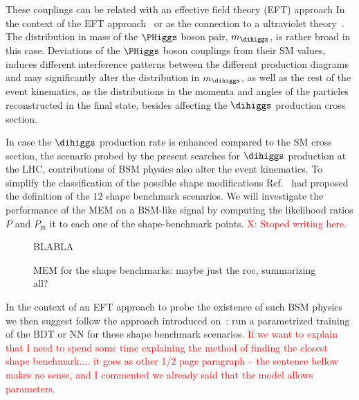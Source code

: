 These couplings can be related with an effective field theory (EFT) approach
In the context of the EFT approach~\cite{Buchalla:2015wfa, Goertz:2014qta} or as the connection to a ultraviolet theory~\cite{Carvalho:2017vnu,Belusca-Maito:2016dqe,deBlas:2014mba,Dawson:2017vgm}. %
The distribution in mass of the $\PHiggs$ boson pair, $m_{\dihiggs}$, is rather broad in this case.
Deviations of  the $\PHiggs$ boson couplings from their SM values, 
 induces different interference patterns between the different production diagrams and may  significantly alter the distribution in $m_{\dihiggs}$,
as well as the rest of the event kinematics,
as the distributions in the momenta and angles of the particles reconstructed in the final state,
besides affecting the $\dihiggs$ production cross section.


In case the $\dihiggs$ production rate is enhanced compared to the SM cross section, the scenario probed by the present searches for $\dihiggs$ production at the LHC,
 contributions of BSM physics also alter the event kinematics. To simplify the classification of the possible shape modifications Ref.~\cite{Carvalho:2015ttv} had proposed the definition of the $12$ shape benchmark scenarios. We will investigate the performance of the MEM on a BSM-like signal by computing the likelihood ratios $P$ and $P_{\textrm{m}}$ it to each one of the shape-benchmark points. \textcolor{red}{X: Stoped writing here.}  
 
 \begin{figure}
\setlength{\unitlength}{1mm}
\begin{center}
BLABLA
\end{center}
\caption{
  MEM for the shape benchmarks: maybe just the roc, summarizing all?
}
\label{fig:ttbar_FeynmanDiagram}
\end{figure}
 
 
In the context of an EFT approach to probe the existence of such BSM physics we then suggest follow the approach introduced on~\cite{Carvalho:2016rys}:  run a parametrized training of the BDT or NN for these shape benchmark scenarios. \textcolor{red}{If we want to explain that I need to spend some time explaining the method of finding the closest  shape benchmark.... it goes as other 1/2 page paragraph -- the sentence bellow makes no sense, and I commented we already said that the model allows parameters.} 


